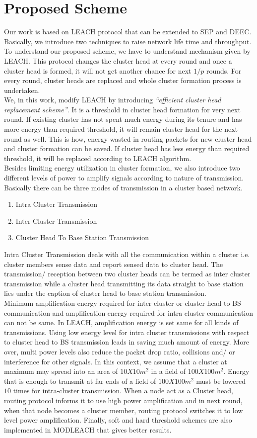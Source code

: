 \documentclass[10pt, conference, compsocconf]{IEEEtran}
\begin{document}
\section{Proposed Scheme}
Our work is based on LEACH protocol that can be extended to SEP and DEEC. Basically, we introduce two techniques to raise network life time and throughput. To understand our proposed scheme, we have to understand mechanism given by LEACH. This protocol changes the cluster head at every round and once a cluster head is formed, it will not get another chance for next $1/p$ rounds. For every round, cluster heads are replaced and whole cluster formation process is undertaken. \\
We, in this work, modify LEACH by introducing \emph{``efficient cluster head replacement scheme''}. It is a threshold in cluster head formation for very next round. If existing cluster has not spent much energy during its tenure and has more energy than required threshold, it will remain cluster head for the next round as well. This is how, energy wasted in routing packets for new cluster head and cluster formation can be saved. If cluster head has less energy than required threshold, it will be replaced according to LEACH algorithm.\\
Besides limiting energy utilization in cluster formation, we also introduce two different levels of power to amplify signals according to nature of transmission. Basically there can be three modes of transmission in a cluster based network.
\begin{enumerate}
  \item {Intra Cluster Transmission}
  \item {Inter Cluster Transmission}
  \item {Cluster Head To Base Station Transmission}
\end{enumerate}
Intra Cluster Transmission deals with all the communication within a cluster i.e. cluster members sense data and report sensed data to cluster head. The transmission/ reception between two cluster heads can be termed as inter cluster transmission while a cluster head transmitting its data straight to base station lies under the caption of cluster head to base station transmission.\\
Minimum amplification energy required for inter cluster or cluster head to BS communication and amplification energy required for intra cluster communication can not be same. In LEACH, amplification energy is set same for all kinds of transmissions. Using low energy level for intra cluster transmissions with respect to cluster head to BS transmission leads in saving much amount of energy. More over, multi power levels also reduce the packet drop ratio, collisions and/ or interference for other signals. In this context, we assume that a cluster at maximum may spread into an area of $10X10 m^2$ in a field of $100X100 m^2$. Energy that is enough to transmit at far ends of a field of $100 X 100 m^2$ must be lowered $10$ times for intra-cluster transmission. When a node act as a Cluster head, routing protocol informs it to use high power amplification and in next round, when that node becomes a cluster member, routing protocol switches it to low level power amplification. Finally, soft and hard threshold schemes are also implemented in MODLEACH that gives better results.
\end{document}
